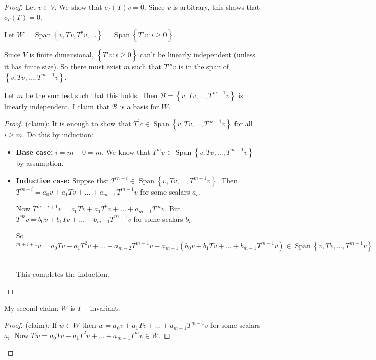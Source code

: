 \documentclass{article}
\theoremstyle{definition} \newtheorem*{definition}{Definition}
\newcommand{\B}{\mathcal{B}}
\DeclareMathOperator{\Span}{Span}
\begin{document}
  \begin{proof}
    Let $v \in V$. We show that $c_T(T)v = 0$. Since $v$ is arbitrary,
    this shows that $c_T(T) = 0$.

    Let $W = \Span\left\{ v, Tv, T^2v, \dots \right\} = 
    \Span\left\{ T^i v : i \geq 0 \right\}$.

    Since $V$ is finite dimensional, $\left\{ T^i v : i \geq 0 \right\}$
    can't be linearly independent (unless it has finite size).
    So there must exist $m$ such that $T^mv$ is in the span of 
    $\left\{ v, Tv, \dots , T^{m-1}v \right\}$.

    Let $m$ be the smallest such that this holds. Then 
    $\B=\left\{ v, Tv, \dots, T^{m-1}v\right\}$ is linearly independent. 
    I claim that $\B$ is a basis for $W$.

    \begin{proof}
      (claim): It is enough to show that $T^ic \in \Span\left\{ 
       v, Tv, \dots, T^{m-1}v
      \right\}$ for all $i \geq m$. Do this by induction:

      \begin{itemize}
        \item \textbf{Base case:} $i = m+0 = m$. We know that
          $T^mv \in \Span\left\{ v, Tv, \dots, T^{m-1}v \right\}$ by
          assumption.
        \item \textbf{Inductive case:} Suppse thst $T^{m+i}\in \Span\left\{ v, Tv, \dots, T^{m-1}v \right\}$. Then $T^{m+i} = 
          a_0v + a_1Tv + \dots + a_{m-1}T^{m-1}v$ for some scalars $a_i$.

          Now $T^{m+i+1}v = a_0 Tv + a_1T^2v + \dots + a_{m-1}T^mv$.
          But $T^mv = b_0v + b_1Tv + \dots + b_{m-1}T^{m-1}v$ for
          some scalars $b_i$.

          So $^{m+i+1}v = a_0 Tv + a_1T^2v + \dots + a_{m-2}T^{m-1}v
          + a_{m-1}(b_0 v + b_1 Tv + \dots + b_{m-1}T^{m-1}v)
          \in \Span\left\{ v, Tv, \dots, T^{m-1}v \right\}$.

          This completes the induction.
      \end{itemize}
    \end{proof}

    My second claim: $W$ is $T-$invariant. 
    
    \begin{proof}
      (claim):
      If $w\in W$ then $w = a_0v + a_1Tv + \dots + a_{m-1}T^{m-1}v$ for 
      some scalars $a_i$. Now
      $Tw = a_0 Tv + a_1 T^2v + \dots + a_{m-1}T^mv \in W$.
    \end{proof}
  \end{proof}
\end{document}
